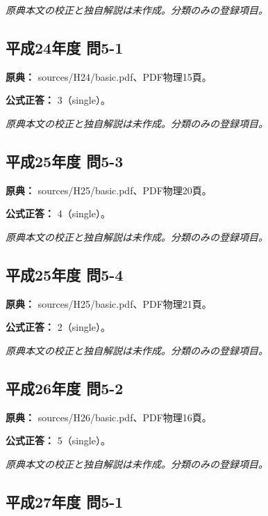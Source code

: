 \par\textit{原典本文の校正と独自解説は未作成。分類のみの登録項目。}

\subsection{平成24年度 問5-1}
\label{q:h24-reg-basic-5-1}

\noindent\textbf{原典：} sources/H24/basic.pdf、PDF物理15頁。

\textbf{公式正答：} 3（single）。

\par\textit{原典本文の校正と独自解説は未作成。分類のみの登録項目。}

\subsection{平成25年度 問5-3}
\label{q:h25-reg-basic-5-3}

\noindent\textbf{原典：} sources/H25/basic.pdf、PDF物理20頁。

\textbf{公式正答：} 4（single）。

\par\textit{原典本文の校正と独自解説は未作成。分類のみの登録項目。}

\subsection{平成25年度 問5-4}
\label{q:h25-reg-basic-5-4}

\noindent\textbf{原典：} sources/H25/basic.pdf、PDF物理21頁。

\textbf{公式正答：} 2（single）。

\par\textit{原典本文の校正と独自解説は未作成。分類のみの登録項目。}

\subsection{平成26年度 問5-2}
\label{q:h26-reg-basic-5-2}

\noindent\textbf{原典：} sources/H26/basic.pdf、PDF物理16頁。

\textbf{公式正答：} 5（single）。

\par\textit{原典本文の校正と独自解説は未作成。分類のみの登録項目。}

\subsection{平成27年度 問5-1}
\label{q:h27-reg-basic-5-1}

